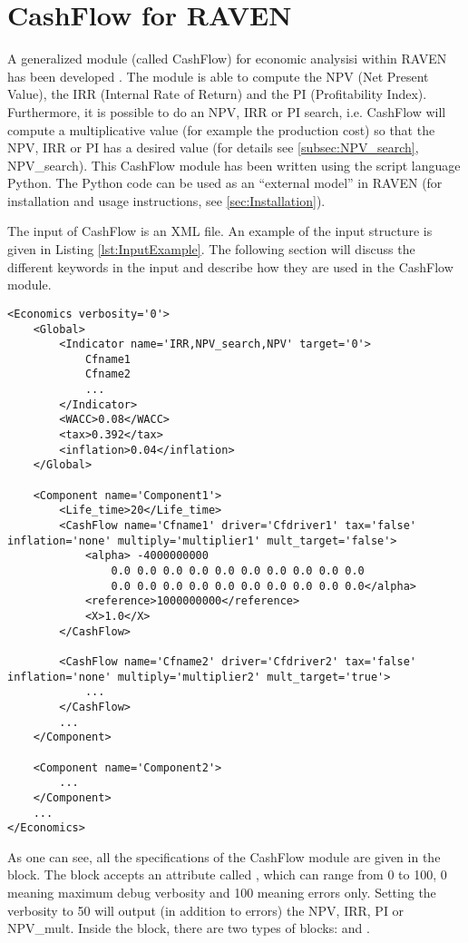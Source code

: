 \section{CashFlow for RAVEN}
A generalized module (called CashFlow) for economic analysisi within RAVEN has been developed \cite{MSApril2017}. The module is able to compute 
the NPV (Net Present Value), the IRR (Internal Rate of Return) and the PI (Profitability Index). Furthermore, it is possible to 
do an NPV, IRR or PI search, i.e. CashFlow will compute a multiplicative value (for example the production cost) so that the 
NPV, IRR or PI has a desired value (for details see \ref{subsec:NPV_search}, NPV\_search). This CashFlow module has been written using the script language Python. 
The Python code can be used as an “external model” in RAVEN (for installation and usage instructions, see \ref{sec:Installation}).

The input of CashFlow is an XML file. An example of the input structure is given in Listing \ref{lst:InputExample}. The following section will discuss the
 different keywords in the input and describe how they are used in the CashFlow module.

\begin{lstlisting}[style=XML,morekeywords={anAttribute},caption=Economics input example., label=lst:InputExample]
<Economics verbosity='0'>
    <Global>
        <Indicator name='IRR,NPV_search,NPV' target='0'>
            Cfname1
            Cfname2
            ...
        </Indicator>
        <WACC>0.08</WACC>
        <tax>0.392</tax>
        <inflation>0.04</inflation>
    </Global>

    <Component name='Component1'>
        <Life_time>20</Life_time>
        <CashFlow name='Cfname1' driver='Cfdriver1' tax='false' inflation='none' multiply='multiplier1' mult_target='false'>
            <alpha> -4000000000
                0.0 0.0 0.0 0.0 0.0 0.0 0.0 0.0 0.0 0.0
                0.0 0.0 0.0 0.0 0.0 0.0 0.0 0.0 0.0 0.0</alpha>
            <reference>1000000000</reference>
            <X>1.0</X>
        </CashFlow>

        <CashFlow name='Cfname2' driver='Cfdriver2' tax='false' inflation='none' multiply='multiplier2' mult_target='true'>
            ...
        </CashFlow>
        ...
    </Component>

    <Component name='Component2'>
        ...
    </Component>
    ...
</Economics>
\end{lstlisting}

As one can see, all the specifications of the CashFlow module are given in the  block. The block accepts an attribute called , 
which can range from 0 to 100, 0 meaning maximum debug verbosity and 100 meaning errors only. Setting the verbosity to 50 will output (in addition to errors) the NPV, IRR, PI or NPV\_mult. Inside the  block, there are two types of blocks:  and .

